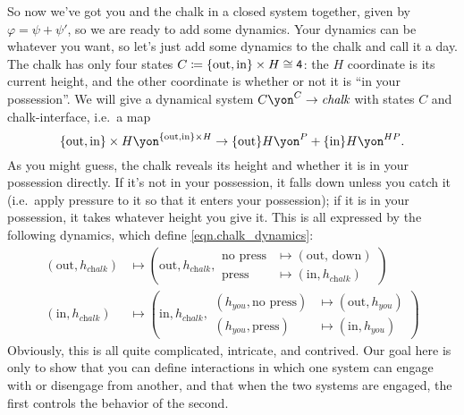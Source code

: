 \documentclass[Book-Poly]{subfiles}
\begin{document}
\begin{example}
So now we've got you and the chalk in a closed system together, given by $\varphi=\psi+\psi'$, so we are ready to add some dynamics. Your dynamics can be whatever you want, so let's just add some dynamics to the chalk and call it a day. The chalk has only four states $C\coloneqq \{\text{out}, \text{in}\} \times H \cong\textsf{4}$: the $H$ coordinate is its current height, and the other coordinate is whether or not it is ``in your possession''. We will give a dynamical system $C\yon^C\to\textit{chalk}$ with states $C$ and chalk-interface, i.e.\ a map
\begin{equation}\label{eqn.chalk_dynamics}
	\{\text{out}, \text{in}\} \times H\yon^{\{\text{out}, \text{in}\} \times H}\to \{\text{out}\}H\yon^P + \{\text{in}\}H\yon^{HP}.
\end{equation}
As you might guess, the chalk reveals its height and whether it is in your possession directly. If it's not in your possession, it falls down unless you catch it (i.e.\ apply pressure to it so that it enters your possession); if it is in your possession, it takes whatever height you give it. This is all expressed by the following dynamics, which define \eqref{eqn.chalk_dynamics}:
\begin{align*}
  (\text{out}, h_\textit{chalk})&\mapsto
  	\left(\text{out}, h_\textit{chalk},
		\begin{aligned}
			\text{no press} &\mapsto (\text{out, down}) \\
			\text{press} &\mapsto (\text{in}, h_\textit{chalk})
		\end{aligned}\right)\\
	(\text{in}, h_\textit{chalk})&\mapsto
		\left(\text{in},h_\textit{chalk},
		\begin{aligned}
			(h_\textit{you}, \text{no press}) &\mapsto (\text{out}, h_\textit{you}) \\
			(h_\textit{you}, \text{press}) &\mapsto (\text{in}, h_\textit{you})
		\end{aligned}\right)
\end{align*}
Obviously, this is all quite complicated, intricate, and contrived. Our goal here is only to show that you can define interactions in which one system can engage with or disengage from another, and that when the two systems are engaged, the first controls the behavior of the second.
\end{example}
\end{document}
